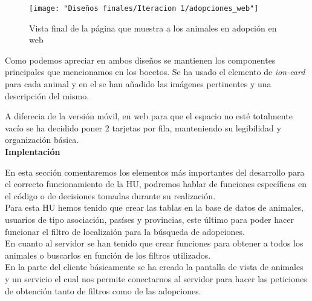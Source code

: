 \begin{figure}[H]
	\centering
	\texttt{[image: "Diseños finales/Iteracion 1/adopciones\_web"]}
	\caption{Vista final de la página que muestra a los animales en adopción en web}
	\label{fig:adopcionesDefWeb}
\end{figure}

Como podemos apreciar en ambos diseños se mantienen los componentes principales que mencionamos en los bocetos. Se ha usado el elemento de \textit{ion-card} para cada animal y en el se han añadido las imágenes pertinentes y una descripción del mismo.

A diferecia de la versión móvil, en web para que el espacio no esté totalmente vacío se ha decidido poner 2 tarjetas por fila, manteniendo su legibilidad y organización básica. \\


\textbf{Implentación}

En esta sección comentaremos los elementos más importantes del desarrollo para el correcto funcionamiento de la HU, podremos hablar de funciones específicas en el código o de decisiones tomadas durante su realización. \\

Para esta HU hemos tenido que crear las tablas en la base de datos de animales, usuarios de tipo asociación, pasíses y provincias, este último para poder hacer funcionar el filtro de localizaión para la búsqueda de adopciones. \\

En cuanto al servidor se han tenido que crear funciones para obtener a todos los animales o buscarlos en función de los filtros utilizados. \\

En la parte del cliente básicamente se ha creado la pantalla de vista de animales y un servicio el cual nos permite conectarnos al servidor para hacer las peticiones de obtención tanto de filtros como de las adopciones.





